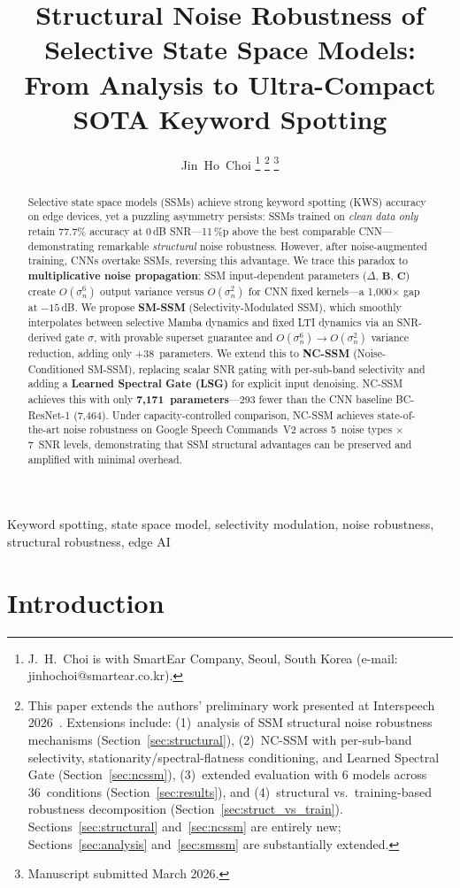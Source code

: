 \documentclass[journal]{IEEEtran}
\title{Structural Noise Robustness of Selective State Space Models: From Analysis to Ultra-Compact SOTA Keyword Spotting}
\author{Jin~Ho~Choi%
\thanks{J.~H.~Choi is with SmartEar Company, Seoul, South Korea (e-mail: jinhochoi@smartear.co.kr).}%
\thanks{This paper extends the authors' preliminary work presented at Interspeech 2026~\cite{choi2026nanomamba_interspeech}. Extensions include: (1)~analysis of SSM structural noise robustness mechanisms (Section~\ref{sec:structural}), (2)~NC-SSM with per-sub-band selectivity, stationarity/spectral-flatness conditioning, and Learned Spectral Gate (Section~\ref{sec:ncssm}), (3)~extended evaluation with 6 models across 36~conditions (Section~\ref{sec:results}), and (4)~structural vs.\ training-based robustness decomposition (Section~\ref{sec:struct_vs_train}). Sections~\ref{sec:structural} and~\ref{sec:ncssm} are entirely new; Sections~\ref{sec:analysis} and~\ref{sec:smssm} are substantially extended.}%
\thanks{Manuscript submitted March 2026.}}
\begin{document}
\maketitle

\begin{abstract}
Selective state space models (SSMs) achieve strong keyword spotting (KWS) accuracy on edge devices, yet a puzzling asymmetry persists: SSMs trained on \emph{clean data only} retain 77.7\% accuracy at 0\,dB SNR---11\,\%p above the best comparable CNN---demonstrating remarkable \emph{structural} noise robustness.
However, after noise-augmented training, CNNs overtake SSMs, reversing this advantage.
We trace this paradox to \textbf{multiplicative noise propagation}: SSM input-dependent parameters ($\Delta$, $\mathbf{B}$, $\mathbf{C}$) create $O(\sigma_n^6)$ output variance versus $O(\sigma_n^2)$ for CNN fixed kernels---a 1{,}000$\times$ gap at $-15$\,dB.
We propose \textbf{SM-SSM} (Selectivity-Modulated SSM), which smoothly interpolates between selective Mamba dynamics and fixed LTI dynamics via an SNR-derived gate $\sigma$, with provable superset guarantee and $O(\sigma_n^6) \to O(\sigma_n^2)$ variance reduction, adding only +38~parameters.
We extend this to \textbf{NC-SSM} (Noise-Conditioned SM-SSM), replacing scalar SNR gating with per-sub-band selectivity and adding a \textbf{Learned Spectral Gate (LSG)} for explicit input denoising.
NC-SSM achieves this with only \textbf{7{,}171~parameters}---293 fewer than the CNN baseline BC-ResNet-1 (7{,}464).
Under capacity-controlled comparison, NC-SSM achieves state-of-the-art noise robustness on Google Speech Commands~V2 across 5~noise types $\times$ 7~SNR levels, demonstrating that SSM structural advantages can be preserved and amplified with minimal overhead.
\end{abstract}

\begin{IEEEkeywords}
Keyword spotting, state space model, selectivity modulation, noise robustness, structural robustness, edge AI
\end{IEEEkeywords}


\section{Introduction}
\label{sec:intro}
\end{document}
